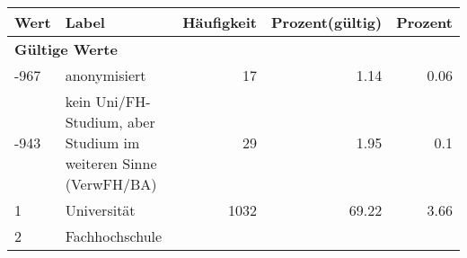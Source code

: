      \begin{longtable}{lXrrr}
     \toprule
     \textbf{Wert} & \textbf{Label} & \textbf{Häufigkeit} & \textbf{Prozent(gültig)} & \textbf{Prozent} \\
     \endhead
     \midrule
     \multicolumn{5}{l}{\textbf{Gültige Werte}}\\

     -967 &
     \multicolumn{1}{X}{ anonymisiert   } &


       \num{17} &
       \num[round-mode=places,round-precision=2]{1.14} &
         \num[round-mode=places,round-precision=2]{0.06} \\

     -943 &
     \multicolumn{1}{X}{ kein Uni/FH-Studium, aber Studium im weiteren Sinne (VerwFH/BA)   } &


       \num{29} &
       \num[round-mode=places,round-precision=2]{1.95} &
         \num[round-mode=places,round-precision=2]{0.1} \\

     1 &
     \multicolumn{1}{X}{ Universität   } &


       \num{1032} &
       \num[round-mode=places,round-precision=2]{69.22} &
         \num[round-mode=places,round-precision=2]{3.66} \\

     2 &
     \multicolumn{1}{X}{ Fachhochschule   } &



\end{longtable}
